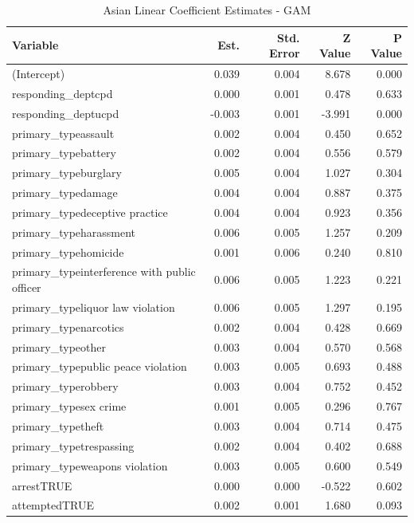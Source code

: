 \documentclass{ucetd}
\begin{document}
\begin{table}

\caption{\label{tab:asian-gam}Asian Linear Coefficient Estimates - GAM}
\centering
\begin{tabular}[t]{l|r|r|r|r}
\hline
Variable & Est. & Std. Error & Z Value & P Value\\
\hline
(Intercept) & 0.039 & 0.004 & 8.678 & 0.000\\
\hline
responding\_deptcpd & 0.000 & 0.001 & 0.478 & 0.633\\
\hline
responding\_deptucpd & -0.003 & 0.001 & -3.991 & 0.000\\
\hline
primary\_typeassault & 0.002 & 0.004 & 0.450 & 0.652\\
\hline
primary\_typebattery & 0.002 & 0.004 & 0.556 & 0.579\\
\hline
primary\_typeburglary & 0.005 & 0.004 & 1.027 & 0.304\\
\hline
primary\_typedamage & 0.004 & 0.004 & 0.887 & 0.375\\
\hline
primary\_typedeceptive practice & 0.004 & 0.004 & 0.923 & 0.356\\
\hline
primary\_typeharassment & 0.006 & 0.005 & 1.257 & 0.209\\
\hline
primary\_typehomicide & 0.001 & 0.006 & 0.240 & 0.810\\
\hline
primary\_typeinterference with public officer & 0.006 & 0.005 & 1.223 & 0.221\\
\hline
primary\_typeliquor law violation & 0.006 & 0.005 & 1.297 & 0.195\\
\hline
primary\_typenarcotics & 0.002 & 0.004 & 0.428 & 0.669\\
\hline
primary\_typeother & 0.003 & 0.004 & 0.570 & 0.568\\
\hline
primary\_typepublic peace violation & 0.003 & 0.005 & 0.693 & 0.488\\
\hline
primary\_typerobbery & 0.003 & 0.004 & 0.752 & 0.452\\
\hline
primary\_typesex crime & 0.001 & 0.005 & 0.296 & 0.767\\
\hline
primary\_typetheft & 0.003 & 0.004 & 0.714 & 0.475\\
\hline
primary\_typetrespassing & 0.002 & 0.004 & 0.402 & 0.688\\
\hline
primary\_typeweapons violation & 0.003 & 0.005 & 0.600 & 0.549\\
\hline
arrestTRUE & 0.000 & 0.000 & -0.522 & 0.602\\
\hline
attemptedTRUE & 0.002 & 0.001 & 1.680 & 0.093\\

\end{tabular}
\end{table}
\end{document}
